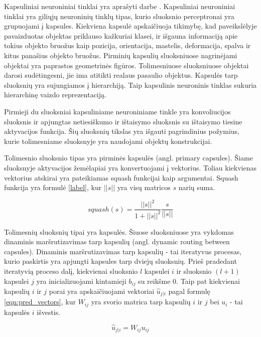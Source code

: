 Kapsuliniai neuroniniai tinklai yra aprašyti darbe \cite{capsNet}. Kapsuliniai neuroniniai tinklai yra giliųjų neuroninių tinklų tipas, kurio sluoksnio perceptronai yra grupuojami į kapsules. Kiekviena kapsulė apskaičiuoja tikimybę, kad paveikslėlyje pavaizduotas objektas priklauso kažkuriai klasei, ir išgauna informaciją apie tokius objekto bruožus kaip pozicija, orientacija, mastelis, deformacija, spalva ir kitus panašius objekto bruožus. Pirminių kapsulių sluoksniuose nagrinėjami objektai yra paprastos geometrinės figūros. Tolimesniuose sluoksniuose objektai darosi sudėtingesni, jie ima atitikti realaus pasaulio objektus. Kapsulės tarp sluoksnių yra sujungiamos į hierarchiją. Taip kapsulinis neuroninis tinklas sukuria hierarchinę vaizdo reprezentaciją.

Pirmieji du sluoksniai kapsuliniame neuroniniame tinkle yra konvoliucijos sluoksnis ir apjungtas netiesiškumo ir ištaisymo sluoksnis su ištaisymo tiesine aktyvacijos funkcija. Šių sluoksnių tikslas yra išgauti pagrindinius požymius, kurie tolimesniame sluoksnyje yra naudojami objektų konstrukcijai.

Tolimesnio sluoksnio tipas yra pirminės kapsulės (angl. primary capsules). Šiame sluoksnyje aktyvacijos žemėlapiai yra konvertuojami į vektorius. Toliau kiekvienas vektorius atskirai yra pateikiamas squash funkcijai kaip argumentai. Squash funkcija yra formulė \ref{label}, kur $||s||$ yra visų matricos $s$ narių suma.

\begin{equation}
\label{eqn:squash}
	squash(s) = \dfrac{||s||^2}{1 + ||s||^2}\dfrac{s}{||s||}
\end{equation}

Tolimesnių sluoksnių tipai yra kapsulės. Šiuose sluoksniuose yra vykdomas dinaminis maršrutizavimas tarp kapsulių (angl. dynamic routing between capsules). Dinaminis maršrutizavimas tarp kapsulių - tai iteratyvus procesas, kurio paskirtis yra apjungti kapsules tarp dviejų sluoksnių. Prieš pradedant iteratyvią proceso dalį, kiekvienai sluoksnio $l$ kapsulei $i$ ir sluoksnio $(l + 1)$ kapsulei $j$ yra inicializuojami kintamieji $b_{ij}$ su reikšme 0. Taip pat kiekvienai kapsulių $i$ ir $j$ porai yra apskaičiuojami vektoriai $\hat{u}_{j|i}$ pagal formulę \ref{eqn:pred_vectors}, kur $W_{ij}$ yra svorio matrica tarp kapsulių $i$ ir $j$ bei $u_{i}$ - tai kapsulės $i$ išvestis.

\begin{equation}
\label{eqn:pred_vectors}
	\hat{u}_{j|i} = W_{ij} u_{ij}
\end{equation}

